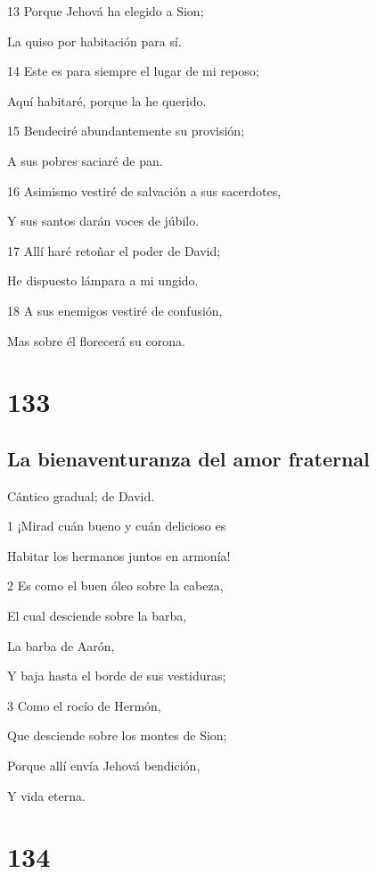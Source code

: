 \par 13 Porque Jehová ha elegido a Sion;
\par La quiso por habitación para sí.
\par 14 Este es para siempre el lugar de mi reposo;
\par Aquí habitaré, porque la he querido.
\par 15 Bendeciré abundantemente su provisión;
\par A sus pobres saciaré de pan.
\par 16 Asimismo vestiré de salvación a sus sacerdotes,
\par Y sus santos darán voces de júbilo.
\par 17 Allí haré retoñar el poder de David;
\par He dispuesto lámpara a mi ungido.
\par 18 A sus enemigos vestiré de confusión,
\par Mas sobre él florecerá su corona.

\chapter{133}

\section*{La bienaventuranza del amor fraternal}

\par Cántico gradual; de David.

\par 1 ¡Mirad cuán bueno y cuán delicioso es
\par Habitar los hermanos juntos en armonía!
\par 2 Es como el buen óleo sobre la cabeza,
\par El cual desciende sobre la barba,
\par La barba de Aarón,
\par Y baja hasta el borde de sus vestiduras;
\par 3 Como el rocío de Hermón,
\par Que desciende sobre los montes de Sion;
\par Porque allí envía Jehová bendición,
\par Y vida eterna.

\chapter{134}

